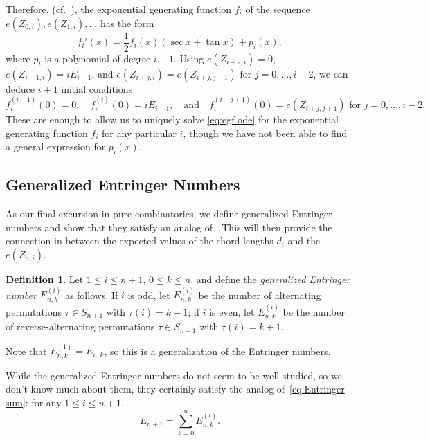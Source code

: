 \documentclass{article}
\theoremstyle{definition}
\newtheorem{definition}[theorem]{Definition}
\newcommand{\ent}[2]{E_{#1,#2}}
\newcommand{\gent}[3]{E_{#1,#2}^{(#3)}}
\begin{document}
Therefore, (cf.~\cite{millarNewOperationSequences1996}), the exponential generating function $f_i$ of the sequence $e(Z_{0 , i}),e(Z_{1 , i}),\dots$ has the form
\begin{equation}\label{eq:egf ode}
	f_i'(x) = \frac{1}{2} f_i(x)(\sec x + \tan x) + p_i(x),
\end{equation}
where $p_i$ is a polynomial of degree $i-1$. Using $e(Z_{i-2,i}) =0$, $e(Z_{i-1,i}) = i E_{i-1}$, and $e(Z_{i+j,i}) = e(Z_{i+j,j+1})$ for $j=0, \dots , i-2$, we can deduce $i+1$ initial conditions
\begin{equation}\label{eq:egf ode ics}
	f_i^{(i-1)}(0) = 0, \quad f_i^{(i)}(0) = i E_{i-1}, \quad \text{and} \quad f_i^{(i+j+1)}(0) = e(Z_{i+j,j+1}) \text{ for }j=0, \dots , i-2.
\end{equation}
These are enough to allow us to uniquely solve \eqref{eq:egf ode} for the exponential generating function $f_i$ for any particular $i$, though we have not been able to find a general expression for $p_i(x)$.

\subsection{Generalized Entringer Numbers} 
\label{sub:generalized_entringer_numbers}

As our final excursion in pure combinatorics, we define generalized Entringer numbers and show that they satisfy an analog of . This will then provide the connection in  between the expected values of the chord lengths $d_i$ and the $e(Z_{n,i})$.

\begin{definition}\label{def:generalized entringer}
	Let $1 \leq i \leq n+1$, $0 \leq k \leq n$, and define the \emph{generalized Entringer number} $\gent{n}{k}{i}$ as follows. If $i$ is odd, let $\gent{n}{k}{i}$ be the number of alternating permutations $\tau \in S_{n+1}$ with $\tau(i) = k+1$; if $i$ is even, let $\gent{n}{k}{i}$ be the number of reverse-alternating permutations $\tau \in S_{n+1}$ with $\tau(i) = k+1$.
\end{definition}

Note that $\gent{n}{k}{1} = \ent{n}{k}$, so this is a generalization of the Entringer numbers.

While the generalized Entringer numbers do not seem to be well-studied, so we don't know much about them, they certainly satisfy the analog of~\eqref{eq:Entringer sum}: for any $1 \leq i \leq n+1$,
\begin{equation}\label{eq:generalized Entringer sum}
	E_{n+1} = \sum_{k=0}^n \gent{n}{k}{i}.
\end{equation}
\end{document}

